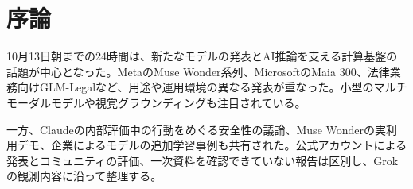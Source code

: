 \section*{序論}
10月13日朝までの24時間は、新たなモデルの発表とAI推論を支える計算基盤の話題が中心となった。MetaのMuse Wonder系列、MicrosoftのMaia 300、法律業務向けGLM-Legalなど、用途や運用環境の異なる発表が重なった。小型のマルチモーダルモデルや視覚グラウンディングも注目されている。

一方、Claudeの内部評価中の行動をめぐる安全性の議論、Muse Wonderの実利用デモ、企業によるモデルの追加学習事例も共有された。公式アカウントによる発表とコミュニティの評価、一次資料を確認できていない報告は区別し、Grokの観測内容に沿って整理する。
